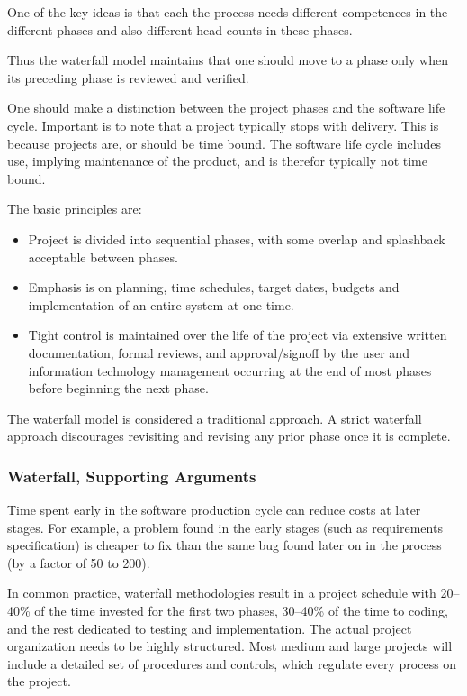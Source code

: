 One of the key ideas is that each the process needs different competences
in the different phases and also different head counts in these phases.

Thus the waterfall model maintains that one should move to a phase only when its preceding phase is reviewed and verified.

One should make a distinction between the project phases and the
software life cycle. Important is to note that a project typically
stops with delivery. This is because projects are, or should be time
bound. The software life cycle includes use, implying  maintenance
of the product,  and is therefor typically not time bound.

The basic principles are:
\begin{itemize}
\item Project is divided into sequential phases, with some overlap and splashback acceptable between phases.
\item Emphasis is on planning, time schedules, target dates, budgets and implementation of an entire system at one time.
\item Tight control is maintained over the life of the project via
  extensive written documentation, formal reviews, and
  approval/signoff by the user and information technology management
  occurring at the end of most phases before beginning the next
  phase. 
\end{itemize} \cite{wiki:spd}

The waterfall model is considered a traditional approach. 
A strict waterfall approach discourages revisiting and revising any prior phase
once it is complete. 

\subsubsection{Waterfall, Supporting Arguments}
Time spent early in the software production cycle can reduce costs at
later stages. For example, a problem found in the early stages (such
as requirements specification) is cheaper to fix than the same bug
found later on in the process (by a factor of 50 to 200).

In common practice, waterfall methodologies result in a project
schedule with 20–40\% of the time invested for the first two phases,
30–40\% of the time to coding, and the rest dedicated to testing and
implementation. The actual project organization needs to be highly
structured. Most medium and large projects will include a detailed set
of procedures and controls, which regulate every process on the
project.

